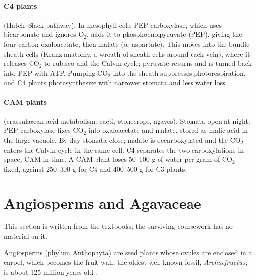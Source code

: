 \paragraph{C4 plants} (Hatch--Slack
pathway). In mesophyll cells PEP
carboxylase, which uses bicarbonate and
ignores $\mathrm{O_2}$, adds it to
phosphoenolpyruvate (PEP), giving the
four-carbon oxaloacetate, then malate (or
aspartate). This moves into the
bundle-sheath cells (Kranz anatomy, a
wreath of sheath cells around each vein),
where it releases $\mathrm{CO_2}$ to rubisco
and the Calvin cycle; pyruvate returns and is
turned back into PEP with ATP. Pumping
$\mathrm{CO_2}$ into the sheath suppresses
photorespiration, and C4 plants
photosynthesize
with narrower stomata and less water loss.

\paragraph{CAM plants} (crassulacean acid
metabolism; cacti, stonecrops, agaves).
Stomata open at night: PEP carboxylase fixes
$\mathrm{CO_2}$ into oxaloacetate and
malate, stored as malic acid in the large
vacuole. By day stomata close; malate is
decarboxylated and the $\mathrm{CO_2}$
enters the Calvin cycle in the same cell.
C4 separates the two carboxylations in
space, CAM in time. A CAM plant loses 50--100
g of water per gram of $\mathrm{CO_2}$
fixed, against 250--300 g for C4 and
400--500 g for C3 plants.

\section{Angiosperms and Agavaceae}
\label{section-angiosperms}

This section is written from the textbooks;
the surviving coursework has no material on
it.

Angiosperms (phylum Anthophyta) are seed
plants whose ovules are enclosed in a
carpel, which becomes the fruit wall; the
oldest well-known fossil,
\emph{Archaefructus}, is about 125 million
years old \cite[Chapters
19--20]{evert2013raven}.

